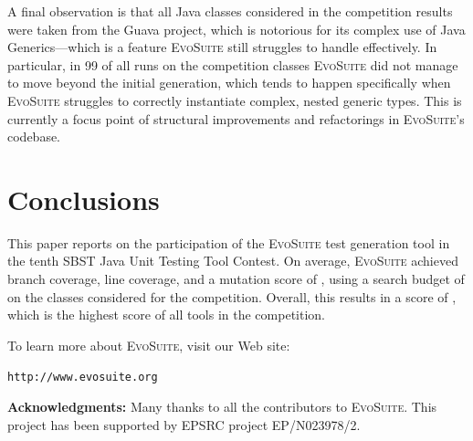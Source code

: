 \documentclass[sigconf,review,anonymous]{acmart}
\newcommand{\EVOSUITE}{\textsc{EvoSuite}\xspace}
\begin{document}
A final observation is that all \cuts Java classes considered in the competition
results were taken from the Guava project, which is notorious for its complex
use of Java Generics---which is a feature \EVOSUITE still struggles to handle
effectively. In particular, in 99 of all runs on the \cuts competition classes
\EVOSUITE did not manage to move beyond the initial generation, which tends to
happen specifically when \EVOSUITE struggles to correctly instantiate complex,
nested generic types. This is currently a focus point of structural
improvements and refactorings in \EVOSUITE's codebase.






\section{Conclusions}

This paper reports on the participation of the \EVOSUITE test generation tool
in the tenth SBST Java Unit Testing Tool Contest. On average, \EVOSUITE achieved
\avgConditionsCoverageRatioLong branch coverage, \avgLinesCoverageRatioLong line coverage, 
and a mutation score of \avgMutantsCoverageRatioLong, using a
search budget of \budgetLong on the \cuts classes considered for the competition.
Overall, this results in a score of \score, which is the highest score of all
tools in the competition.


To learn more about \EVOSUITE, visit our Web site:
\begin{center}
\texttt{http://www.evosuite.org}
\end{center}



\textbf{Acknowledgments:} Many thanks to all the contributors to
\EVOSUITE.
This project has been supported by EPSRC project %
EP/N023978/2.




\balance
\end{document}

